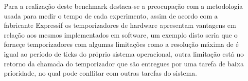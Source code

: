 Para a realização deste benchmark destaca-se a preocupação com a metodologia usada para medir o tempo 
de cada experimento, assim de acordo com a fabricante \cite{} {Expressif} os temporizadores de hardware apresentam 
vantagens em relação aos mesmos implementados em software, um exemplo disto seria que o \cite{FreeRTOS} 
forneçe temporizadores com algumas limitações como a resolução máxima de é igual ao período de ticks 
do próprio sistema operacional, outra limitação está no retorno da chamada do temporizador que são entregues 
por uma tarefa de baixa prioridade, no qual pode conflitar com outras tarefas do sistema. 



